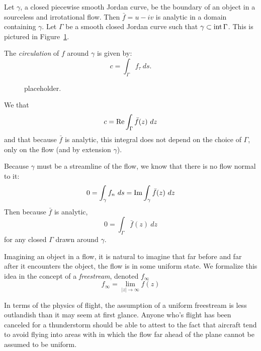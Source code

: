 \documentclass[letterpaper, twoside, 12 pt]{article}
\begin{document}
	\begin{definition}[Circulation]
		Let $\gamma$, a closed piecewise smooth Jordan curve, be the boundary of an object in a sourceless and irrotational flow. 
		Then $\bar f  = u - iv$ is analytic in a domain containing $\gamma$.
		Let $\Gamma$ be a smooth closed Jordan curve such that $\gamma \subset \intr \Gamma$.
		This is pictured in Figure~\ref{fig:circulation}.

		The \textit{circulation} of $f$ around $\gamma$ is given by:
		\[
			c = \int_\Gamma f_\tau \ ds.
		\]
	\end{definition}
	\begin{figure}[H]
		\centering
		\begin{tikzpicture}
			
		\end{tikzpicture}
		\captionsetup{width = 0.5 \textwidth}
		\caption{
			placeholder.
		}
		\label{fig:circulation}
	\end{figure}

	\begin{remark}
		We that 
		\[
			c = \re \int_\Gamma \bar f(z) \ dz
		\]
		and that because $\bar f$ is analytic, this integral does not depend on the choice of $\Gamma$, only on the flow (and by extension $\gamma$).

		Because $\gamma$ must be a streamline of the flow, we know that there is no flow normal to it:
		\[
			0 = \int_\gamma f_n \ ds = \im \int_\gamma \bar f(z) \ dz
		\]
		Then because $\bar f$ is analytic, 
		\[
			0 = \int_\Gamma \bar f (z)\ dz
		\]
		for any closed $\Gamma$ drawn around $\gamma$.
	\end{remark}

	\begin{definition}[Freestream]
		Imagining an object in a flow, it is natural to imagine that far before and far after it encounters the object, the flow is in some uniform state.
		We formalize this idea in the concept of a \textit{freestream}, denoted $f_\infty$
		\[
			f_\infty = \lim_{|z| \to \infty} f(z)
		\]
	\end{definition}

	\begin{remark}
		In terms of the physics of flight, the assumption of a uniform freestream is less outlandish than it may seem at first glance.
		Anyone who's flight has been canceled for a thunderstorm should be able to attest to the fact that aircraft tend to avoid flying into areas with in which the flow far ahead of the plane cannot be assumed to be uniform.
	\end{remark}
\end{document}
